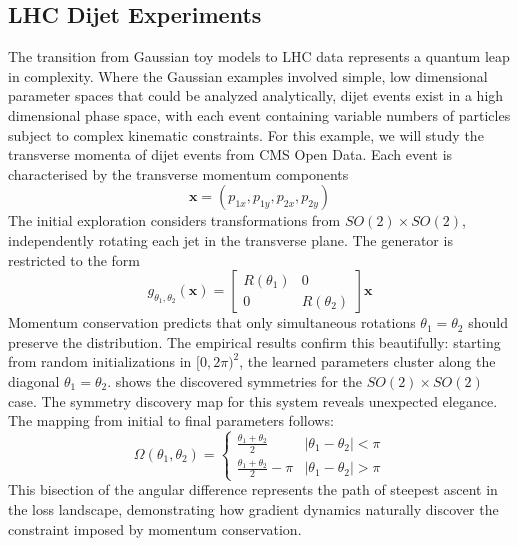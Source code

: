         \subsection{LHC Dijet Experiments}
            The transition from Gaussian toy models to LHC data represents a quantum leap in complexity.
            Where the Gaussian examples involved simple, low dimensional parameter spaces that could be analyzed analytically, dijet events exist in a high dimensional phase space, with each event containing variable numbers of particles subject to complex kinematic constraints.
            For this example, we will study the transverse momenta of dijet events from CMS Open Data.
            Each event is characterised by the transverse momentum components
            \[
                \mathbf{x} = (p_{1x}, p_{1y}, p_{2x}, p_{2y})
            \]
            The initial exploration considers transformations from \(SO(2) \times SO(2)\), independently rotating each jet in the transverse plane.
            The generator is restricted to the form
            \[
                g_{\theta_1,\theta_2}(\mathbf{x}) = \begin{bmatrix}
                    R(\theta_1) & 0 \\
                    0 & R(\theta_2)
                \end{bmatrix} \mathbf{x}
            \]
            Momentum conservation predicts that only simultaneous rotations \(\theta_1 = \theta_2\) should preserve the distribution.
            The empirical results confirm this beautifully: starting from random initializations in \([0, 2\pi)^2\), the learned parameters cluster along the diagonal \(\theta_1 = \theta_2\).
             shows the discovered symmetries for the \(SO(2) \times SO(2)\) case.
            The symmetry discovery map for this system reveals unexpected elegance.
            The mapping from initial to final parameters follows:
            \[
                \Omega(\theta_1, \theta_2) = \begin{cases}
                    \frac{\theta_1 + \theta_2}{2} & |\theta_1 - \theta_2| < \pi \\
                    \frac{\theta_1 + \theta_2}{2} - \pi & |\theta_1 - \theta_2| > \pi
                \end{cases}
            \]
            This bisection of the angular difference represents the path of steepest ascent in the loss landscape, demonstrating how gradient dynamics naturally discover the constraint imposed by momentum conservation.
                
